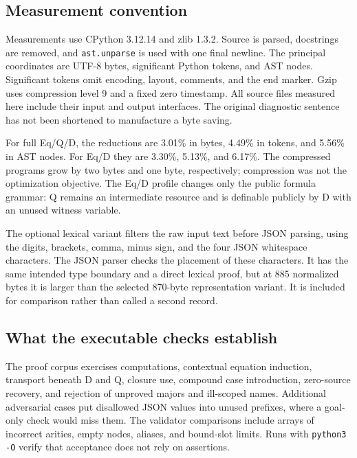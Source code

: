 \documentclass[11pt,letterpaper]{article}
\theoremstyle{definition}
\theoremstyle{remark}
\begin{document}
\subsection{Measurement convention}
Measurements use CPython 3.12.14 and zlib 1.3.2. Source is parsed, docstrings
are removed, and \texttt{ast.unparse} is used with one final newline. The
principal coordinates are UTF-8 bytes, significant Python tokens, and AST
nodes. Significant tokens omit encoding, layout, comments, and the end
marker. Gzip uses compression level 9 and a fixed zero timestamp. All source
files measured here include their input and output interfaces. The original
diagnostic sentence has not been shortened to manufacture a byte saving.



For full Eq/Q/D, the reductions are 3.01\% in bytes, 4.49\% in tokens,
and 5.56\% in AST nodes. For Eq/D they are 3.30\%, 5.13\%, and 6.17\%.
The compressed programs grow by two bytes and one byte, respectively;
compression was not the optimization objective. The Eq/D profile changes
only the public formula grammar: Q remains an intermediate resource and is
definable publicly by D with an unused witness variable.

The optional lexical variant filters the raw input text before JSON parsing,
using the digits, brackets, comma, minus sign, and the four JSON whitespace
characters. The JSON parser checks the placement of these characters.
It has the same intended type boundary and a direct lexical proof, but at
885 normalized bytes it is larger than the selected 870-byte representation
variant. It is included for comparison rather than called a second record.

\subsection{What the executable checks establish}


The proof corpus exercises computations, contextual equation induction,
transport beneath D and Q, closure use, compound case introduction,
zero-source recovery, and rejection of unproved majors and ill-scoped
names. Additional adversarial cases put disallowed JSON values into unused
prefixes, where a goal-only check would miss them. The validator comparisons
include arrays of incorrect arities, empty nodes, aliases, and bound-slot
limits. Runs with \texttt{python3 -O} verify that acceptance does not rely
on assertions.
\end{document}
